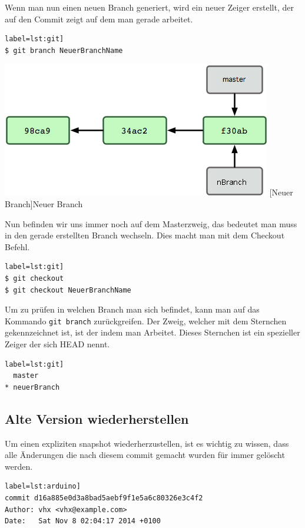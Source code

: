 \documentclass[12pt,a4paper,bibliography=totocnumbered,listof=totocnumbered]{scrartcl}
\begin{document}
Wenn man nun einen neuen Branch generiert, wird ein neuer Zeiger erstellt, der auf den Commit zeigt auf dem man gerade arbeitet.

\begin{lstlisting}[caption=Branch Befeh] label=lst:git]
$ git branch NeuerBranchName
\end{lstlisting}


\vspace{2em}
\begin{minipage}{\linewidth}
	\centering
	\includegraphics[width=0.6\linewidth]{Bilder/nbranch.png}
	[Neuer Branch]{Neuer Branch\footnotemark }
	\label{Neuer Branch}
\end{minipage}

Nun befinden wir uns immer noch auf dem Masterzweig, das bedeutet man muss in den gerade erstellten Branch wechseln.
Dies macht man mit dem Checkout Befehl.

\begin{lstlisting}[caption=Branch Befehl] label=lst:git]
$ git checkout 
$ git checkout NeuerBranchName
\end{lstlisting}

Um zu prüfen in welchen Branch man sich befindet, kann man auf das Kommando \lstinline|git branch| zurückgreifen. Der Zweig, welcher mit dem Sternchen gekennzeichnet ist, ist der indem man Arbeitet. Dieses Sternchen ist ein spezieller Zeiger der sich HEAD nennt. 

\begin{lstlisting}[caption=Aktuellen Branch prüfen] label=lst:git]
  master
* neuerBranch
\end{lstlisting}

\subsection{Alte Version wiederherstellen}
Um einen expliziten snapshot wiederherzustellen, ist es wichtig zu wissen, dass alle Änderungen die nach diesem commit gemacht wurden für immer gelöscht werden. 

\begin{lstlisting}[caption=git log Befehl] label=lst:arduino]
commit d16a885e0d3a8bad5aebf9f1e5a6c80326e3c4f2
Author: vhx <vhx@example.com>
Date:   Sat Nov 8 02:04:17 2014 +0100
\end{lstlisting}
\end{document}
